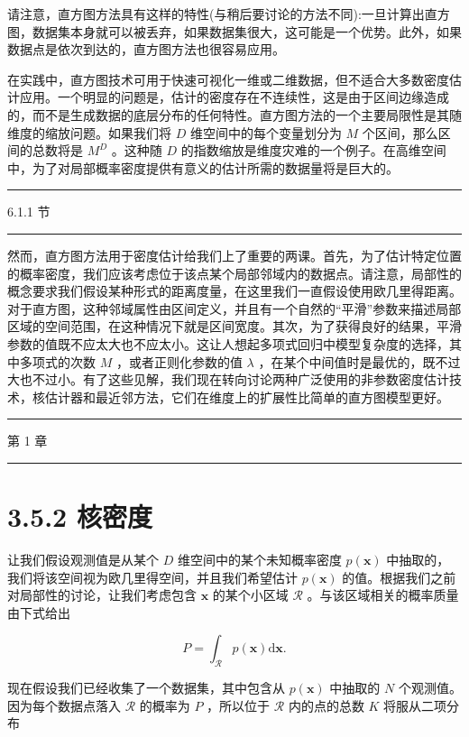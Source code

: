 \documentclass[10pt]{article}
\newcommand{\HRule}{\begin{center}\rule{0.9\linewidth}{0.2mm}\end{center}}
\begin{document}
请注意，直方图方法具有这样的特性(与稍后要讨论的方法不同):一旦计算出直方图，数据集本身就可以被丢弃，如果数据集很大，这可能是一个优势。此外，如果数据点是依次到达的，直方图方法也很容易应用。

在实践中，直方图技术可用于快速可视化一维或二维数据，但不适合大多数密度估计应用。一个明显的问题是，估计的密度存在不连续性，这是由于区间边缘造成的，而不是生成数据的底层分布的任何特性。直方图方法的一个主要局限性是其随维度的缩放问题。如果我们将 \(D\) 维空间中的每个变量划分为 \(M\) 个区间，那么区间的总数将是 \({M}^{D}\) 。这种随 \(D\) 的指数缩放是维度灾难的一个例子。在高维空间中，为了对局部概率密度提供有意义的估计所需的数据量将是巨大的。

\HRule

6.1.1 节

\HRule

然而，直方图方法用于密度估计给我们上了重要的两课。首先，为了估计特定位置的概率密度，我们应该考虑位于该点某个局部邻域内的数据点。请注意，局部性的概念要求我们假设某种形式的距离度量，在这里我们一直假设使用欧几里得距离。对于直方图，这种邻域属性由区间定义，并且有一个自然的“平滑”参数来描述局部区域的空间范围，在这种情况下就是区间宽度。其次，为了获得良好的结果，平滑参数的值既不应太大也不应太小。这让人想起多项式回归中模型复杂度的选择，其中多项式的次数 \(M\) ，或者正则化参数的值 \(\lambda\) ，在某个中间值时是最优的，既不过大也不过小。有了这些见解，我们现在转向讨论两种广泛使用的非参数密度估计技术，核估计器和最近邻方法，它们在维度上的扩展性比简单的直方图模型更好。

\HRule

第 1 章

\HRule

\section*{3.5.2 核密度}

让我们假设观测值是从某个 \(D\) 维空间中的某个未知概率密度 \(p\left( \mathbf{x}\right)\) 中抽取的，我们将该空间视为欧几里得空间，并且我们希望估计 \(p\left( \mathbf{x}\right)\) 的值。根据我们之前对局部性的讨论，让我们考虑包含 \(\mathbf{x}\) 的某个小区域 \(\mathcal{R}\) 。与该区域相关的概率质量由下式给出

\[
P = {\int }_{\mathcal{R}}p\left( \mathbf{x}\right) \mathrm{d}\mathbf{x}. \tag{3.176}
\]

现在假设我们已经收集了一个数据集，其中包含从 \(p\left( \mathbf{x}\right)\) 中抽取的 \(N\) 个观测值。因为每个数据点落入 \(\mathcal{R}\) 的概率为 \(P\) ，所以位于 \(\mathcal{R}\) 内的点的总数 \(K\) 将服从二项分布
\end{document}
